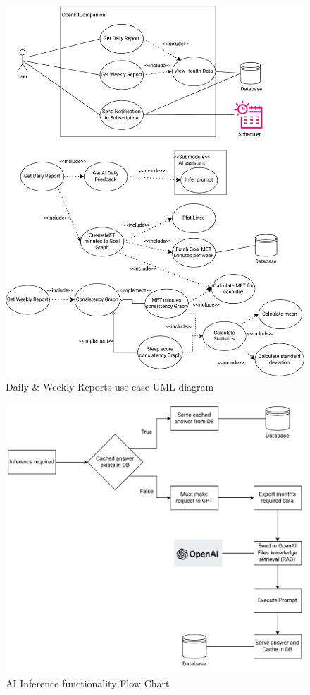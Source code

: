 \begin{figure}
    
    \centering
    \includegraphics[width=\textwidth,height=\textheight,keepaspectratio]{../images/reports.pdf}
    \caption{Daily \& Weekly Reports use case UML diagram}
    \label{fig:4}
    
\end{figure}
\begin{figure}
    
    \centering
    \includegraphics[width=\textwidth,height=\textheight,keepaspectratio]{../images/ai.pdf}
    \caption{AI Inference functionality Flow Chart}
    \label{fig:5}
    
\end{figure}


